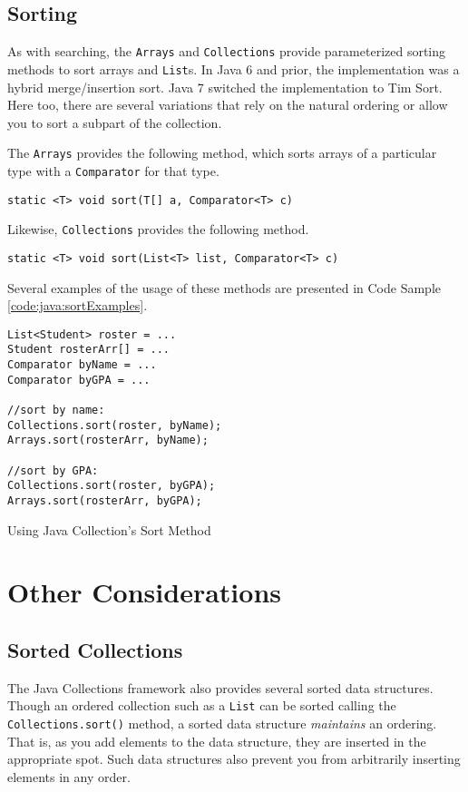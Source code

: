 \subsection{Sorting}

As with searching, the \texttt{Arrays} and \texttt{Collections}
provide parameterized sorting methods to sort arrays and \texttt{List}s.
In Java 6 and prior, the implementation was a hybrid merge/insertion sort.  Java 7
switched the implementation to Tim Sort.  Here too, there are several variations 
that rely on the natural ordering or allow you to sort a subpart of the collection.

The \texttt{Arrays} provides the following method, which sorts 
arrays of a particular type with a \texttt{Comparator} for that type.

\texttt{static <T> void sort(T[] a, Comparator<T> c)}

Likewise, \texttt{Collections} provides the following method.

\texttt{static <T> void sort(List<T> list, Comparator<T> c)}

Several examples of the usage of these methods are presented in Code
Sample \ref{code:java:sortExamples}.

\begin{listing}[H]
\begin{verbatim}
List<Student> roster = ...
Student rosterArr[] = ...
Comparator byName = ...
Comparator byGPA = ...

//sort by name:
Collections.sort(roster, byName);
Arrays.sort(rosterArr, byName);

//sort by GPA:
Collections.sort(roster, byGPA);
Arrays.sort(rosterArr, byGPA);
\end{verbatim}
\caption{Using Java Collection's Sort Method}
\label{code:java:sortExamples}
\end{listing}

\section{Other Considerations}

\subsection{Sorted Collections}

The Java Collections framework also provides several sorted data structures.
Though an ordered collection such as a \texttt{List} can be sorted
calling the \texttt{Collections.sort()} method, a sorted data
structure \emph{maintains} an ordering.  That is, as you add elements to 
the data structure, they are inserted in the appropriate spot.  Such data 
structures also prevent you from arbitrarily inserting elements in any 
order.  

